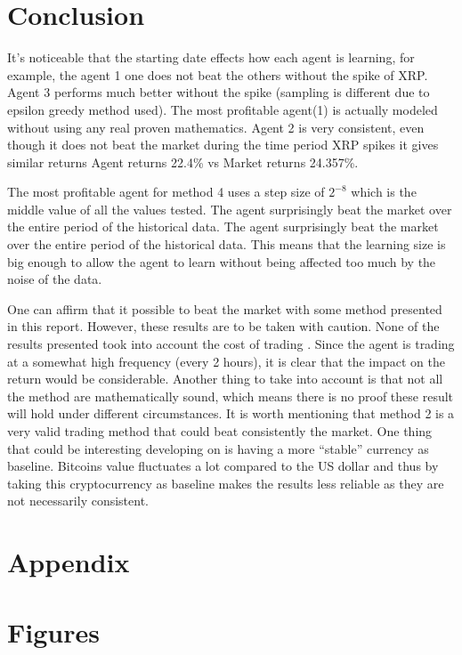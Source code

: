 \documentclass[a4paper,12pt]{article}
\begin{document}
\section{Conclusion}
It’s noticeable that the starting date effects how each agent is learning, for example, the agent 1 one does not beat the others without the spike of XRP. Agent 3 performs much better without the spike (sampling is different due to epsilon greedy method used). The most profitable agent(1) is actually modeled without using any real proven mathematics. Agent 2 is very consistent, even though it does not beat the market during the time period XRP spikes it gives similar returns Agent returns 22.4\% vs Market returns 24.357\%. \par
The most profitable agent for method 4 uses a step size of $2^{-8}$ which is the middle value of all the values tested. The agent surprisingly beat the market over the entire period of the historical data. The agent surprisingly beat the market over the entire period of the historical data. This means that the learning size is big enough to allow the agent to learn without being affected too much by the noise of the data. \par
One can affirm that it possible to beat the market with some method presented in this report. However, these results are to be taken with caution. None of the results presented took into account the cost of trading . Since the agent is trading at a somewhat high frequency (every 2 hours), it is clear that the impact on the return would be considerable. Another thing to take into account is that not all the method are mathematically sound, which means there is no proof these result will hold under different circumstances. It is worth mentioning that method 2 is a very valid trading method that could beat consistently the market. One thing that could be interesting developing on is having a more “stable” currency as baseline. Bitcoins value fluctuates a lot compared to the US dollar and thus by taking this cryptocurrency as baseline makes the results less reliable as they are not necessarily consistent.  

\newpage

\section{Appendix}
\appendix
{}

\section{Figures}
\end{document}
